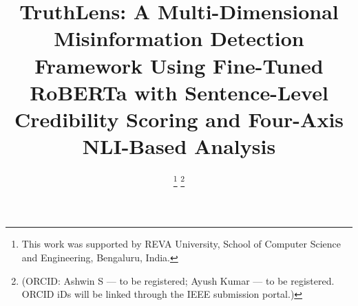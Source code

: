 \documentclass[journal]{IEEEtran}
\begin{document}
\title{TruthLens: A Multi-Dimensional Misinformation Detection Framework
Using Fine-Tuned RoBERTa with Sentence-Level Credibility Scoring
and Four-Axis NLI-Based Analysis}

\author{


  \thanks{This work was supported by REVA University, School of Computer
  Science and Engineering, Bengaluru, India.}
  \thanks{(ORCID: Ashwin S — to be registered; Ayush Kumar — to be registered.
  ORCID iDs will be linked through the IEEE submission portal.)}
}

\maketitle
\end{document}
